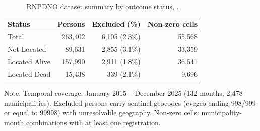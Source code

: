 \begin{table}[htbp]
\centering
\caption{RNPDNO dataset summary by outcome status, \studyperiod{}.}\label{tab:dataset}
\begin{tabular}{lrrr}
  \toprule
  \textbf{Status} & \textbf{Persons} & \textbf{Excluded (\%)} & \textbf{Non-zero cells} \\
  \midrule
  Total         & 263,402 & 6,105 (2.3\%) & 55,568 \\
  Not Located   &  89,631 & 2,855 (3.1\%) & 33,359 \\
  Located Alive & 157,990 & 2,911 (1.8\%) & 36,541 \\
  Located Dead  &  15,438 &   339 (2.1\%) &  9,696 \\
  \bottomrule
\end{tabular}
\begin{tablenotes}
\small
\item Note: Temporal coverage: January 2015 -- December 2025 (132 months, 2,478 municipalities).
Excluded persons carry sentinel geocodes (cvegeo ending 998/999 or equal to 99998) with unresolvable geography.
Non-zero cells: municipality-month combinations with at least one registration.
\end{tablenotes}
\end{table}